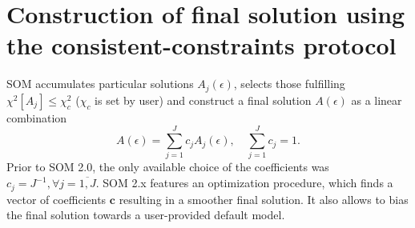 \documentclass[]{article}
\begin{document}
\section{Construction of final solution using the consistent-constraints protocol}
\label{final_solution_cc}

SOM accumulates particular solutions $A_j(\epsilon)$, selects those
fulfilling $\chi^2[A_j] \leq \chi^2_c$ ($\chi_c$ is set by user) and construct a final solution $A(\epsilon)$ as a linear combination
\begin{equation}
    A(\epsilon) = \sum_{j=1}^J c_j A_j(\epsilon), \quad
    \sum_{j=1}^J c_j = 1.
\end{equation}
Prior to SOM 2.0, the only available choice of the coefficients was $c_j = J^{-1}, \forall j=\overline{1,J}$. SOM 2.x features an optimization procedure, which finds a vector of coefficients $\mathbf{c}$ resulting in a smoother final solution. It also allows to bias the final solution towards a user-provided default model.
\end{document}
